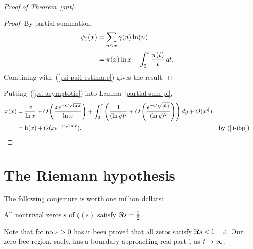 \begin{proof}[Proof of Theorem~\ref{pnt}]
\begin{proof}
 By partial summation,
\begin{align*}
\psi_1(x)&=\sum_{n\le x} \gamma(n)\ln(n)\\
&=\pi(x)\ln x-\int_2^x\frac{\pi(t)}{t} \,dt.
\end{align*}
Combining with~(\ref{psi-psi1-estimate}) gives the result.
\end{proof}
Putting~(\ref{psi-asymptotic}) into Lemma~\ref{partial-sum-pi},
\begin{align*}
\pi(x)&=\fc{x}{\ln x}+O\pf{xe^{-C\sqrt{\ln x}}}{\ln x}+\int_2^x\pa{\frac{1}{(\ln y)^2}+O\pf{e^{-C\sqrt{\ln y}}}{(\ln y)^2}}dy+O(x^{\rc 2})\\
&=\li(x)+O(xe^{-C\sqrt{\ln x}}).&\by{li-ibp}\qedhere
\end{align*}
\end{proof}
\section{The Riemann hypothesis}
The following conjecture is worth one million dollars:
\begin{conj}
All nontrivial zeros $s$ of $\zeta(s)$ %
satisfy $\Re s=\frac{1}{2}$.
\end{conj}
Note that for no $\varepsilon>0$ has it been proved that all zeros satisfy $\Re s<1-\varepsilon$. Our zero-free region, sadly, has a boundary approaching real part 1 as $t\to \infty$.

